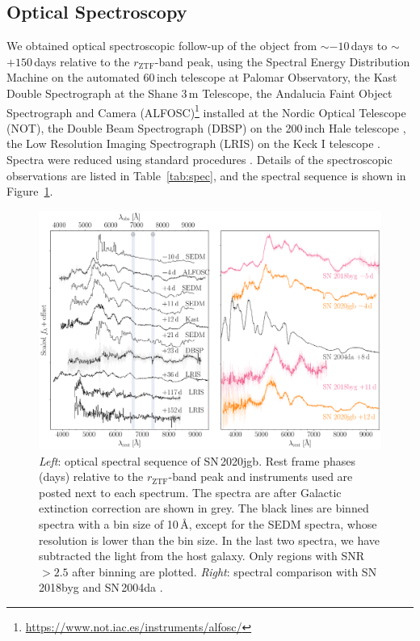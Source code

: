 \documentclass[twocolumn]{aastex631}
\newcommand{\sn}{SN\,2020jgb}
\begin{document}
\subsection{Optical Spectroscopy}\label{sec:optical_spec}
We obtained optical spectroscopic follow-up of the object from $\sim$$-10$\,days to $\sim$$+150$\,days relative to the $r_\mathrm{ZTF}$-band peak, using the Spectral Energy Distribution Machine \citep[SEDM;][]{SEDM_2018} on the automated 60\,inch telescope \citep[P60;][]{P60_2006} at Palomar Observatory, the Kast Double Spectrograph \citep{miller1994kast} at the Shane 3\,m Telescope, the Andalucia Faint Object Spectrograph and Camera (ALFOSC)\footnote{\url{https://www.not.iac.es/instruments/alfosc/}} installed at the Nordic Optical Telescope (NOT), the Double Beam Spectrograph (DBSP) on the 200\,inch Hale telescope \citep[P200;][]{P200_1982}, the Low Resolution Imaging Spectrograph (LRIS) on the Keck I telescope \citep{Keck_1995}. Spectra were reduced using standard procedures \citep[e.g.,][]{Matheson_2000}. Details of the spectroscopic observations are listed in Table~\ref{tab:spec}, and the spectral sequence is shown in Figure~\ref{fig:spec_evo}.


\begin{figure}
    \centering
    \includegraphics[width=\textwidth]{optical_spec_evolution.pdf}
    \caption{\textit{Left}: optical spectral sequence of \sn. Rest frame phases (days) relative to the $r_\mathrm{ZTF}$-band peak and instruments used are posted next to each spectrum. The spectra are after Galactic extinction correction are shown in grey. The black lines are binned spectra with a bin size of 10\,\AA, except for the SEDM spectra, whose resolution is lower than the bin size. In the last two spectra, we have subtracted the light from the host galaxy. Only regions with SNR $>2.5$ after binning are plotted. 
    \textit{Right}: spectral comparison with SN\,2018byg \citep[sub-luminous He-shell DDet;][]{de_18byg_2019} and SN\,2004da \citep[normal luminosity;][]{Silverman_2012}.}
    \label{fig:spec_evo}
\end{figure}
\end{document}
